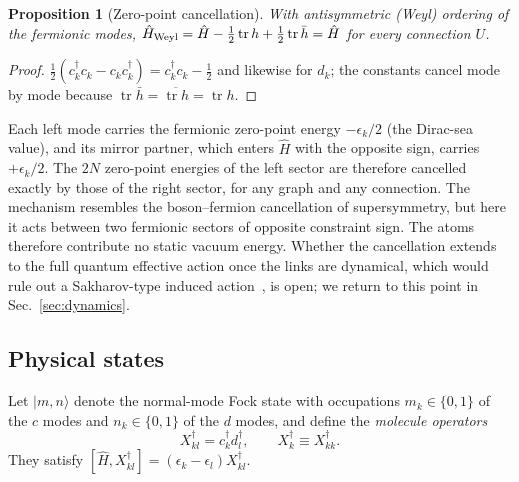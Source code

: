 \documentclass[reprint,aps,prd,amsmath,amssymb,superscriptaddress,nofootinbib,floatfix]{revtex4-2}
\theoremstyle{plain}
\newtheorem{proposition}{Proposition}
\theoremstyle{definition}
\theoremstyle{remark}
\newcommand{\Mol}{\ensuremath{X}}                 %
\newcommand{\ket}[1]{\ensuremath{|#1\rangle}}
\newcommand{\tr}{\operatorname{tr}}
\newcommand{\Hc}{\hat{H}}
\begin{document}
\begin{proposition}[Zero-point cancellation]
\label{prop:zp}
With antisymmetric (Weyl) ordering of the fermionic modes, $\Hc_{\rm Weyl}=\Hc-\tfrac12\tr h+\tfrac12\tr\bar h=\Hc$ for every
connection $U$.
\end{proposition}
\begin{proof}
$\tfrac12(c_k^\dagger c_k-c_kc_k^\dagger)=c_k^\dagger c_k-\tfrac12$ and likewise for $d_k$; the constants cancel
mode by mode because $\tr\bar h=\overline{\tr h}=\tr h$.
\end{proof}

Each left mode carries the fermionic zero-point energy $-\epsilon_k/2$ (the Dirac-sea value), and its mirror partner,
which enters $\Hc$ with the opposite sign, carries $+\epsilon_k/2$. The $2N$ zero-point energies of the left sector are
therefore cancelled exactly by those of the right sector, for any graph and any connection. The mechanism resembles
the boson--fermion cancellation of supersymmetry, but here it acts between two fermionic sectors of opposite
constraint sign. The atoms therefore contribute no static vacuum energy. Whether the cancellation extends to the full
quantum effective action once the links are dynamical, which would rule out a Sakharov-type induced
action~\cite{Sakharov2000}, is open; we return to this point in Sec.~\ref{sec:dynamics}.

\subsection{Physical states}

Let $\ket{m,n}$ denote the normal-mode Fock state with occupations $m_k\in\{0,1\}$ of the $c$ modes and $n_k\in\{0,1\}$
of the $d$ modes, and define the \emph{molecule operators}
\begin{equation}
\Mol^\dagger_{kl}=c_k^\dagger d_l^\dagger ,\qquad \Mol^\dagger_k\equiv\Mol^\dagger_{kk}.
\label{eq:molop}
\end{equation}
They satisfy $[\Hc,\Mol^\dagger_{kl}]=(\epsilon_k-\epsilon_l)\Mol^\dagger_{kl}$.
\end{document}
